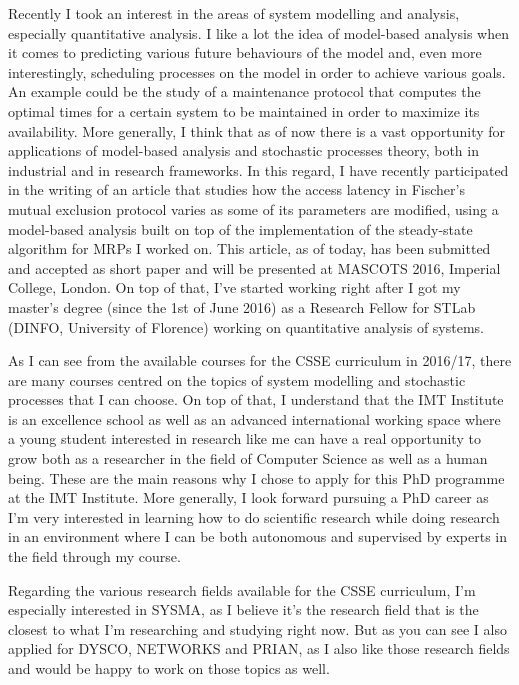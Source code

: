 \documentclass{article}
\begin{document}
    Recently I took an interest in the areas of system modelling and analysis, especially quantitative analysis. I like a lot the idea of model-based analysis when it comes to predicting various future behaviours of the model and, even more interestingly, scheduling processes on the model in order to achieve various goals. An example could be the study of a maintenance protocol that computes the optimal times for a certain system to be maintained in order to maximize its availability. More generally, I think that as of now there is a vast opportunity for applications of model-based analysis and stochastic processes theory, both in industrial and in research frameworks. In this regard, I have recently participated in the writing of an article that studies how the access latency in Fischer's mutual exclusion protocol varies as some of its parameters are modified, using a model-based analysis built on top of the implementation of the steady-state algorithm for MRPs I worked on. This article, as of today, has been submitted and accepted as short paper and will be presented at MASCOTS 2016, Imperial College, London. On top of that, I've started working right after I got my master's degree (since the 1st of June 2016) as a Research Fellow for STLab (DINFO, University of Florence) working on quantitative analysis of systems. \par \bigskip
    
    As I can see from the available courses for the CSSE curriculum in 2016/17, there are many courses centred on the topics of system modelling and stochastic processes that I can choose. On top of that, I understand that the IMT Institute is an excellence school as well as an advanced international working space where a young student interested in research like me can have a real opportunity to grow both as a researcher in the field of Computer Science as well as a human being. These are the main reasons why I chose to apply for this PhD programme at the IMT Institute. More generally, I look forward pursuing a PhD career as I'm very interested in learning how to do scientific research while doing research in an environment where I can be both autonomous and supervised by experts in the field through my course. \par \bigskip
    
    Regarding the various research fields available for the CSSE curriculum, I'm especially interested in SYSMA, as I believe it's the research field that is the closest to what I'm researching and studying right now. But as you can see I also applied for DYSCO, NETWORKS and PRIAN, as I also like those research fields and would be happy to work on those topics as well. \par \bigskip
    
\end{document}
